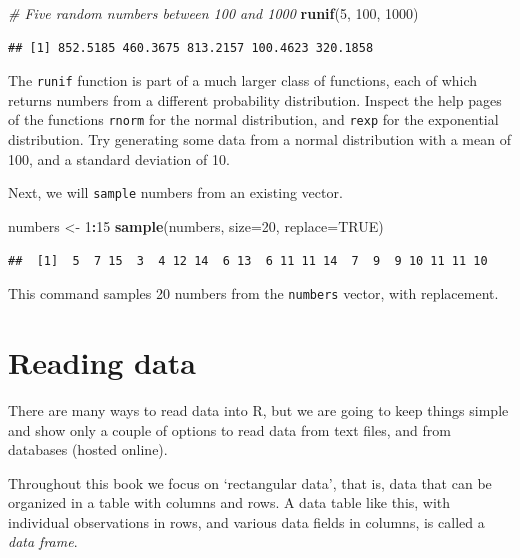 \documentclass[]{book}
\newenvironment{Shaded}{\begin{snugshade}}{\end{snugshade}}
\newcommand{\CommentTok}[1]{\textcolor[rgb]{0.56,0.35,0.01}{\textit{#1}}}
\newcommand{\DataTypeTok}[1]{\textcolor[rgb]{0.13,0.29,0.53}{#1}}
\newcommand{\DecValTok}[1]{\textcolor[rgb]{0.00,0.00,0.81}{#1}}
\newcommand{\KeywordTok}[1]{\textcolor[rgb]{0.13,0.29,0.53}{\textbf{#1}}}
\newcommand{\NormalTok}[1]{#1}
\newcommand{\OperatorTok}[1]{\textcolor[rgb]{0.81,0.36,0.00}{\textbf{#1}}}
\newcommand{\OtherTok}[1]{\textcolor[rgb]{0.56,0.35,0.01}{#1}}
\newcommand{\StringTok}[1]{\textcolor[rgb]{0.31,0.60,0.02}{#1}}
\let\BeginKnitrBlock\begin \let\EndKnitrBlock\end
\begin{document}
\begin{Shaded}
\begin{Highlighting}[]
\CommentTok{# Five random numbers between 100 and 1000}
\KeywordTok{runif}\NormalTok{(}\DecValTok{5}\NormalTok{, }\DecValTok{100}\NormalTok{, }\DecValTok{1000}\NormalTok{)}
\end{Highlighting}
\end{Shaded}

\begin{verbatim}
## [1] 852.5185 460.3675 813.2157 100.4623 320.1858
\end{verbatim}

\BeginKnitrBlock{rmdtry}
The \texttt{runif} function is part of a much larger class of functions, each of which returns
numbers from a different probability distribution. Inspect the help pages of the functions \texttt{rnorm}
for the normal distribution, and \texttt{rexp} for the exponential distribution. Try generating some data from a normal distribution with a mean of 100, and a standard deviation of 10.
\EndKnitrBlock{rmdtry}

Next, we will \texttt{sample} numbers from an existing vector.

\begin{Shaded}
\begin{Highlighting}[]
\NormalTok{numbers <-}\StringTok{ }\DecValTok{1}\OperatorTok{:}\DecValTok{15}
\KeywordTok{sample}\NormalTok{(numbers, }\DataTypeTok{size=}\DecValTok{20}\NormalTok{, }\DataTypeTok{replace=}\OtherTok{TRUE}\NormalTok{)}
\end{Highlighting}
\end{Shaded}

\begin{verbatim}
##  [1]  5  7 15  3  4 12 14  6 13  6 11 11 14  7  9  9 10 11 11 10
\end{verbatim}

This command samples 20 numbers from the \texttt{numbers} vector, with replacement.

\hypertarget{readingdata}{%
\section{Reading data}\label{readingdata}}

There are many ways to read data into R, but we are going to keep things simple and show only a couple of options to read data from text files, and from databases (hosted online).

Throughout this book we focus on `rectangular data', that is, data that can be organized in a table with columns and rows. A data table like this, with individual observations in rows, and various data fields in columns, is called a \emph{data frame}.
\end{document}
